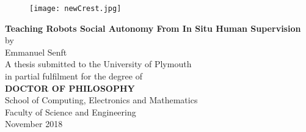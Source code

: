 \begin{center}
\begin{figure}[h]
\centering
\texttt{[image: newCrest.jpg]}
\end{figure}
\vspace{36pt}
\LARGE 
\textbf{Teaching Robots Social Autonomy From In Situ Human Supervision}
\\
\vspace{12pt}
\Large by
\\
\vspace{12pt}
\LARGE 
Emmanuel Senft
\\
\vspace{48pt}
\Large 
A thesis submitted to the University of Plymouth
\\
in partial fulfilment for the degree of
\vspace{36pt}
\\
\textbf{DOCTOR OF PHILOSOPHY}
\vspace{36pt}
\\
School of Computing, Electronics and Mathematics\\
Faculty of Science and Engineering
\vspace{36pt}
\\
\vspace{36pt}
November 2018
\end{center}

\normalsize

